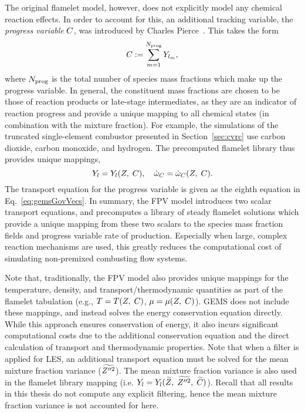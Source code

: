 The original flamelet model, however, does not explicitly model any chemical reaction effects. In order to account for this, an additional tracking variable, the \textit{progress variable} $C$, was introduced by Charles Pierce~\cite{Pierce2001}. This takes the form
%
\begin{equation}\label{eq:progVarDef}
	C := \sum_{m = 1}^{N_{\text{prog}}} Y_{l_{m}},
\end{equation}
%
where $N_{\text{prog}}$ is the total number of species mass fractions which make up the progress variable. In general, the constituent mass fractions are chosen to be those of reaction products or late-stage intermediates, as they are an indicator of reaction progress and provide a unique mapping to all chemical states (in combination with the mixture fraction). For example, the simulations of the truncated single-element combustor presented in Section~\ref{sec:cvrc} use carbon dioxide, carbon monoxide, and hydrogen. The precomputed flamelet library thus provides unique mappings,
%
\begin{equation}
	Y_{l} = Y_{l}(Z, \; C), \quad \dot{\omega}_{C} = \dot{\omega}_{C}(Z, \; C).
\end{equation}
%
The transport equation for the progress variable is given as the eighth equation in Eq.~\ref{eq:gemsGovVecs}. In summary, the FPV model introduces two scalar transport equations, and precomputes a library of steady flamelet solutions which provide a unique mapping from these two scalars to the species mass fraction fields and progress variable rate of production. Especially when large, complex reaction mechanisms are used, this greatly reduces the computational cost of simulating non-premixed combusting flow systems.

Note that, traditionally, the FPV model also provides unique mappings for the temperature, density, and transport/thermodynamic quantities as part of the flamelet tabulation (e.g., $T = T(Z, \; C)$, $\mu = \mu(Z, \; C)$). GEMS does not include these mappings, and instead solves the energy conservation equation directly. While this approach ensures conservation of energy, it also incurs significant computational costs due to the additional conservation equation and the direct calculation of transport and thermodynamic properties. Note that when a filter is applied for LES, an additional transport equation must be solved for the mean mixture fraction variance ($\widetilde{Z''^2}$). The mean mixture fraction variance is also used in the flamelet library mapping (i.e. $Y_{l} = Y_{l}(\widetilde{Z}, \; \widetilde{Z''^2}, \; \widetilde{C})$). Recall that all results in this thesis do not compute any explicit filtering, hence the mean mixture fraction variance is not accounted for here.